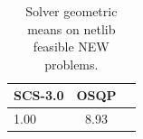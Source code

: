 \begin{table}
\centering
\caption{Solver geometric means on netlib feasible NEW problems.}
\label{t-netlib feasible NEW-geom_mean}
\begin{tabular}{lcc}
\toprule
 SCS-3.0 &  OSQP \\
\midrule
    1.00 &  8.93 \\
\bottomrule
\end{tabular}
\end{table}
